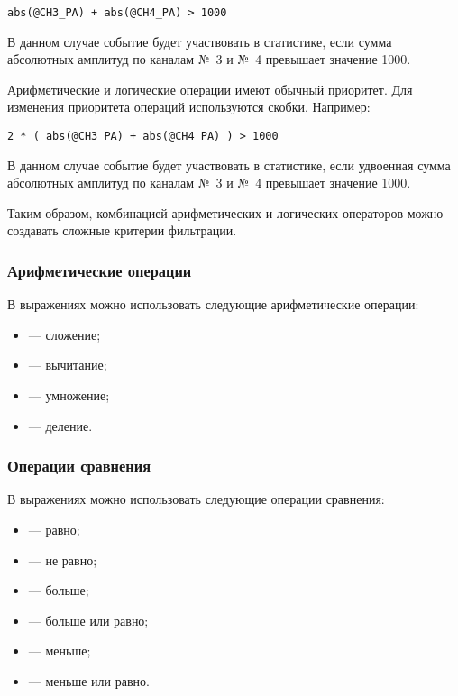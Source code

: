 \begin{lstlisting}
abs(@CH3_PA) + abs(@CH4_PA) > 1000
\end{lstlisting}

В данном случае событие будет участвовать в статистике, если сумма абсолютных амплитуд по каналам №~3 и №~4 превышает значение 1000.

\bigskip

Арифметические и логические операции имеют обычный приоритет. Для изменения приоритета операций используются скобки. Например:

\begin{lstlisting}
2 * ( abs(@CH3_PA) + abs(@CH4_PA) ) > 1000
\end{lstlisting}

В данном случае событие будет участвовать в статистике, если удвоенная сумма абсолютных амплитуд по каналам №~3 и №~4 превышает значение 1000.

\bigskip

Таким образом, комбинацией арифметических и логических операторов можно создавать сложные критерии фильтрации.

\subsubsection{Арифметические операции}

В выражениях можно использовать следующие арифметические операции:

\begin{itemize}
\item \CMDARG{+} --- сложение;
\item \CMDARG{-} --- вычитание;
\item \CMDARG{*} --- умножение;
\item \CMDARG{/} --- деление.
\end{itemize}

\subsubsection{Операции сравнения}

В выражениях можно использовать следующие операции сравнения:

\begin{itemize}
\item \CMDARG{==} --- равно;
\item \CMDARG{!=} --- не равно;
\item \CMDARG{>} --- больше;
\item \CMDARG{>=} --- больше или равно;
\item \CMDARG{<} --- меньше;
\item \CMDARG{<=} --- меньше или равно.
\end{itemize}

